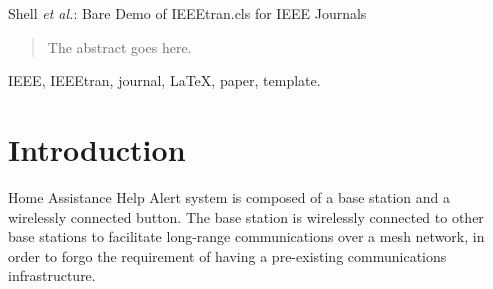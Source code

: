 \documentclass[journal,compsoc]{IEEEtran}
\begin{document}
%
{Shell \MakeLowercase{\textit{et al.}}: Bare Demo of IEEEtran.cls for IEEE Journals}
%











\maketitle

\begin{abstract}
  The abstract goes here.
\end{abstract}

\begin{IEEEkeywords}
  IEEE, IEEEtran, journal, \LaTeX, paper, template.
\end{IEEEkeywords}






%
\IEEEpeerreviewmaketitle

\section{Introduction}
 Home Assistance Help Alert system is composed of a base station and a wirelessly connected button.  The base station is wirelessly connected to other base stations to facilitate long-range communications over a mesh network, in order to forgo the requirement of having a pre-existing communications infrastructure.
\end{document}
